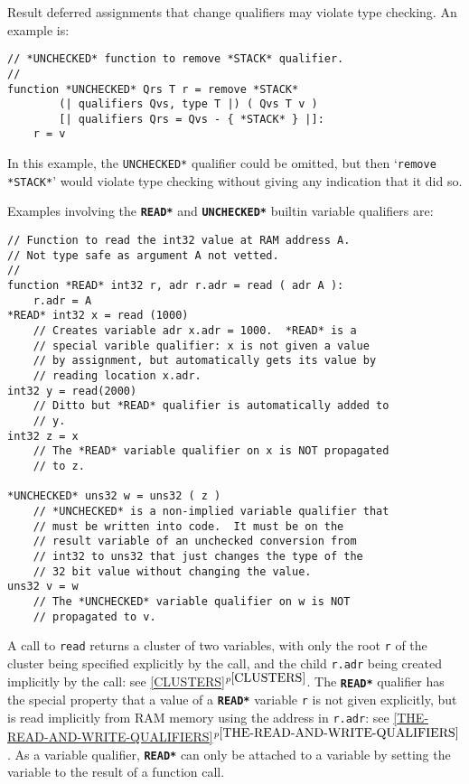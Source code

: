 \documentclass[12pt]{article}
\newcommand{\TT}[1]{{\tt \bfseries #1}}
\newcommand{\itemref}[1]{\ref{#1}$^{p\pageref{#1}}$}
\newenvironment{indpar}[1][0.3in]%
	{\begin{list}{}%
		     {\setlength{\itemsep}{0in}%
		      \setlength{\topsep}{0in}%
		      \setlength{\parsep}{1ex}%
		      \setlength{\labelwidth}{#1}%
		      \setlength{\leftmargin}{#1}%
		      \addtolength{\leftmargin}{\labelsep}}%
	 \item}%
	{\end{list}}
\begin{document}
Result deferred assignments that change qualifiers may violate
type checking.  An example is:
\begin{indpar}\begin{verbatim}
// *UNCHECKED* function to remove *STACK* qualifier.
//
function *UNCHECKED* Qrs T r = remove *STACK*
        (| qualifiers Qvs, type T |) ( Qvs T v )
        [| qualifiers Qrs = Qvs - { *STACK* } |]:
    r = v
\end{verbatim}\end{indpar}

In this example, the {\tt *UNCHECKED*} qualifier could be
omitted, but then `{\tt remove *STACK*}' would violate
type checking without giving any indication that it did so.

Examples involving the \TT{*READ*} and \TT{*UNCHECKED*}
builtin variable qualifiers are:
\begin{indpar}\begin{verbatim}
// Function to read the int32 value at RAM address A.
// Not type safe as argument A not vetted.
//
function *READ* int32 r, adr r.adr = read ( adr A ):
    r.adr = A
*READ* int32 x = read (1000)
    // Creates variable adr x.adr = 1000.  *READ* is a
    // special varible qualifier: x is not given a value
    // by assignment, but automatically gets its value by
    // reading location x.adr.
int32 y = read(2000)
    // Ditto but *READ* qualifier is automatically added to
    // y.
int32 z = x
    // The *READ* variable qualifier on x is NOT propagated
    // to z.

*UNCHECKED* uns32 w = uns32 ( z )
    // *UNCHECKED* is a non-implied variable qualifier that
    // must be written into code.  It must be on the
    // result variable of an unchecked conversion from
    // int32 to uns32 that just changes the type of the
    // 32 bit value without changing the value.
uns32 v = w
    // The *UNCHECKED* variable qualifier on w is NOT
    // propagated to v.
\end{verbatim}\end{indpar}

A call to {\tt read} returns a cluster of
two variables, with only the root {\tt r} of the cluster being
specified explicitly by the call, and the child {\tt r.adr} being
created implicitly by the call: see \itemref{CLUSTERS}.
The \TT{*READ*} qualifier has the special property that a value of a \TT{*READ*}
variable {\tt r} is not given explicitly, but is read implicitly from
RAM memory using the address in {\tt r.adr}:
see \itemref{THE-READ-AND-WRITE-QUALIFIERS}.
As a variable qualifier, \TT{*READ*} can only be attached to
a variable by setting the variable to the result of a
function call.
\end{document}

